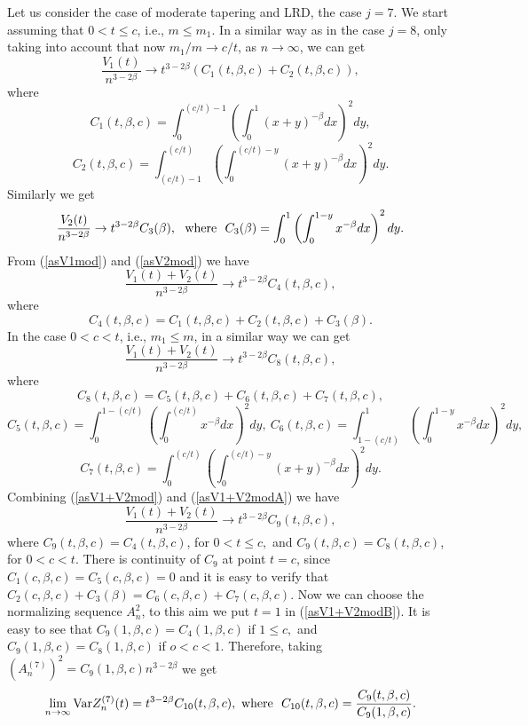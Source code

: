 \documentclass[12pt]{article}
\def\b{\beta}
\theoremstyle{plain}
\theoremstyle{definition}
\begin{document}
Let us consider the case of moderate tapering and LRD, the case $j=7$. We start assuming that $0<t\le c$, i.e., $m\le m_1$. In a similar way as in the case  $j=8$, only taking into account that now $m_1/m \to c/t$,  as $n\to \infty$, we  can get
\begin{equation}\label{asV1mod}
\frac{V_{1}(t)}{n^{3-2\b}} \to t^{3-2\b}\left (C_{1}(t, \b, c)+ C_{2}(t, \b, c) \right ),
\end{equation}
where
$$
C_{1}(t, \b, c)=\int_0^{(c/t)-1}\left (\int_0^{1}(x+y)^{-\b} dx\right )^2 dy,
$$
$$
C_{2}(t, \b, c)=\int_{(c/t)-1}^{(c/t)}\left (\int_0^{(c/t)-y}(x+y)^{-\b} dx\right )^2 dy.
$$
Similarly we get
\begin{equation}\label{asV2mod}
\frac{V_{2}(t)}{n^{3-2\b}} \to t^{3-2\b}C_{3}(\b), \ \ {\rm where} \ \ C_{3}(\b)=\int_0^1\left (\int_0^{1-y}x^{-\b} dx\right )^2 dy.
\end{equation}
From (\ref{asV1mod}) and  (\ref{asV2mod}) we have
\begin{equation}\label{asV1+V2mod}
\frac{V_1(t)+V_{2}(t)}{n^{3-2\b}} \to t^{3-2\b}C_{4}(t, \b, c),
\end{equation}
where
$$
C_{4}(t, \b, c)=C_{1}(t, \b, c)+ C_{2}(t, \b, c) + C_{3}(\b).
$$
In the case $0<c<t$, i.e., $m_1\le m$, in a similar way we can get
\begin{equation}\label{asV1+V2modA}
\frac{V_1(t)+V_{2}(t)}{n^{3-2\b}} \to t^{3-2\b}C_{8}(t, \b, c),
\end{equation}
where
$$
C_{8}(t, \b, c)=C_{5}(t, \b, c)+C_{6}(t, \b, c)+C_{7}(t, \b, c),
$$
$$
C_{5}(t, \b, c)=\int_0^{1-(c/t)}\left (\int_0^{(c/t)}x^{-\b} dx\right )^2 dy, \ C_{6}(t, \b, c)=\int_{1-(c/t)}^{1}\left (\int_0^{1-y}x^{-\b} dx\right )^2 dy,
$$
$$
C_{7}(t, \b, c)=\int_0^{(c/t)}\left (\int_0^{(c/t)-y}(x+y)^{-\b} dx\right )^2 dy.
$$
Combining (\ref{asV1+V2mod}) and (\ref{asV1+V2modA}) we have
\begin{equation}\label{asV1+V2modB}
\frac{V_1(t)+V_{2}(t)}{n^{3-2\b}} \to t^{3-2\b}C_{9}(t, \b, c),
\end{equation}
where $C_{9}(t, \b, c)=C_{4}(t, \b, c)$, for $0<t\le c,$ and $C_{9}(t, \b, c)=C_{8}(t, \b, c)$, for $0<c<t.$
There is continuity of $C_{9}$ at point $t=c$, since $C_{1}(c, \b, c)=C_{5}(c, \b, c)=0$ and it is easy to verify that $ C_{2}(c, \b, c) + C_{3}(\b)=C_{6}(c, \b, c)+C_{7}(c, \b, c)$.
Now we can choose the normalizing sequence $A_n^2$, to this aim we put $t=1$ in (\ref{asV1+V2modB}). It is easy to see that
$C_{9}(1, \b, c)= C_{4}(1, \b, c)$ if $ 1\le c,$ and $C_{9}(1, \b, c)= C_{8}(1, \b, c)$ if $ o<c<1.$
Therefore, taking $\left (A_n^{(7)}\right )^2= C_{9}(1, \b, c)n^{3-2\b}$ we get
\begin{equation}\label{VarZn3}
\lim_{n\to \infty}{\rm Var}Z_n^{(7)}(t)=t^{3-2\b}C_{10}(t, \b, c), \ {\rm where} \ \  C_{10}(t, \b, c)=\frac{C_{9}(t, \b, c)}{C_{9}(1, \b, c)}.
\end{equation}
\end{document}
